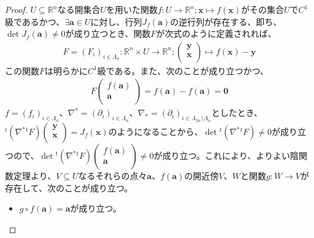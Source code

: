 \documentclass[dvipdfmx]{jsarticle}
\begin{document}
\begin{proof}
$U \subseteq \mathbb{R}^{n}$なる開集合$U$を用いた関数$f:U \rightarrow \mathbb{R}^{n};\mathbf{x} \mapsto f\left( \mathbf{x} \right)$がその集合$U$で$C^{1}$級であるかつ、$\exists\mathbf{a} \in U$に対し、行列$J_{f}\left( \mathbf{a} \right)$の逆行列が存在する、即ち、$\det{J_{f}\left( \mathbf{a} \right)} \neq 0$が成り立つとき、関数$F$が次式のように定義されれば、
\begin{align*}
F = \left( F_{i} \right)_{i \in \varLambda_{n}}:\mathbb{R}^{n} \times U \rightarrow \mathbb{R}^{n};\begin{pmatrix}
\mathbf{y} \\
\mathbf{x} \\
\end{pmatrix} \mapsto f\left( \mathbf{x} \right) - \mathbf{y}
\end{align*}
この関数$F$は明らかに$C^{1}$級である。また、次のことが成り立つかつ、
\begin{align*}
F\begin{pmatrix}
f\left( \mathbf{a} \right) \\
\mathbf{a} \\
\end{pmatrix} = f\left( \mathbf{a} \right) - f\left( \mathbf{a} \right) = \mathbf{0}
\end{align*}
$f = \left( f_{i} \right)_{i \in \varLambda_{n}}$、$\nabla^{*} = \left( \partial_{i} \right)_{i \in \varLambda_{n}}$、$\nabla_{*} = \left( \partial_{i} \right)_{i \in \varLambda_{2n} \setminus \varLambda_{n}}$としたとき、${}^{t}\left( \nabla^{*}{}^{t}F \right)\begin{pmatrix}
\mathbf{y} \\
\mathbf{x} \\
\end{pmatrix} = J_{f}\left( \mathbf{x} \right)$のようになることから、$\det{{}^{t}\left( \nabla^{*}{}^{t}F \right)} \neq 0$が成り立つので、$\det{{}^{t}\left( \nabla^{*}{}^{t}F \right)}\begin{pmatrix}
f\left( \mathbf{a} \right) \\
\mathbf{a} \\
\end{pmatrix} \neq 0$が成り立つ。これにより、よりよい陰関数定理より、$V \subseteq U$なるそれらの点々$\mathbf{a}$、$f\left( \mathbf{a} \right)$の開近傍$V$、$W$と関数$g:W \rightarrow V$が存在して、次のことが成り立つ。
\begin{itemize}
\item
  $g \circ f\left( \mathbf{a} \right) = \mathbf{a}$が成り立つ。

\end{itemize}
\end{proof}
\end{document}
